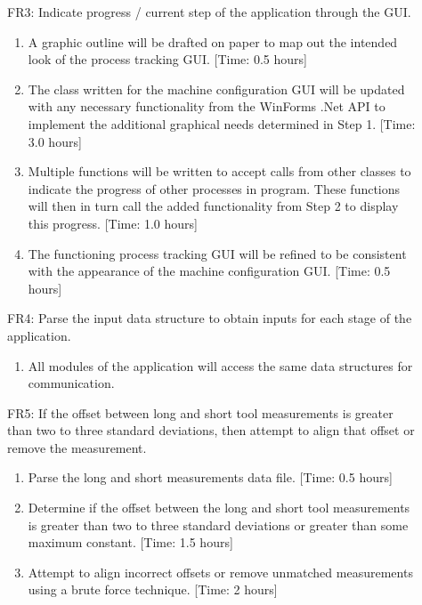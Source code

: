 \documentclass[pdftex,10pt,a4paper]{article}
\begin{document}
\begin{description}
\item[] FR3: Indicate progress / current step of the application through the GUI. 
\begin{enumerate}
\item A graphic outline will be drafted on paper to map out the intended look of the process tracking GUI. [Time: 0.5 hours]
\item The class written for the machine configuration GUI will be updated with any necessary functionality from the WinForms .Net API to implement the additional graphical needs determined in Step 1. [Time: 3.0 hours]
\item Multiple functions will be written to accept calls from other classes to indicate the progress of other processes in program. These functions will then in turn call the added functionality from Step 2 to display this progress. [Time: 1.0 hours]
\item The functioning process tracking GUI will be refined to be consistent with the appearance of the machine configuration GUI. [Time: 0.5 hours]
\end{enumerate}

\item[] FR4: Parse the input data structure to obtain inputs for each stage of the application. 
\begin{enumerate}
\item All modules of the application will access the same data structures for communication.
\end{enumerate}

\item[] FR5: If the offset between long and short tool measurements is greater than two to three standard deviations, then attempt to align that offset or remove the measurement.
\begin{enumerate}
\item Parse the long and short measurements data file. [Time: 0.5 hours]
\item Determine if the offset between the long and short tool measurements is greater than two to three standard deviations or greater than some maximum constant. [Time: 1.5 hours]
\item Attempt to align incorrect offsets or remove unmatched measurements using a brute force technique. [Time: 2 hours]
\end{enumerate}


\end{description}
\end{document}
